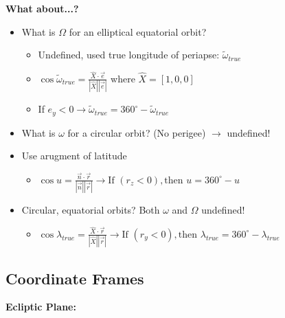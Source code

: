 \documentclass{article}
\begin{document}
\begin{multicols*}{3}
    \textbf{What about...?}
    \begin{itemize}
        \item What is $\Omega$ for an elliptical equatorial orbit?
            \begin{itemize}
                \item Undefined, used true longitude of periapse: $\tilde{\omega}_{true}$
                \item $\cos{\tilde{\omega}_{true}}=\frac{\hat{X}\cdot\vec{e}}{|\hat{X}||\vec{e}|}$ where $\hat{X}=[1,0,0]$
                \item If $e_y<0\rightarrow \tilde{\omega}_{true}=360^\circ-\tilde{\omega}_{true}$
            \end{itemize}
        \item What is $\omega$ for a circular orbit? (No perigee) $\rightarrow$ undefined!
        \item Use arugment of latitude
            \begin{itemize}
                \item $\cos{u}=\frac{\vec{n}\cdot\vec{r}}{|\vec{n}||\vec{r}|}\rightarrow \text{If } (r_z<0), \text{then } u = 360^\circ -u$
            \end{itemize}
        \item Circular, equatorial orbits? Both $\omega$ and $\Omega$ undefined!
            \begin{itemize}
                \item $\cos{\lambda_{true}}=\frac{\hat{X}\cdot{\vec{r}}}{|\hat{X}||\vec{r}|}\rightarrow \text{If } (r_y<0), \text{then } \lambda_{true}=360^\circ - \lambda_{true}$
            \end{itemize}
    \end{itemize}

    \subsection*{Coordinate Frames}
    \textbf{Ecliptic Plane:}\par 
    



\end{multicols*}  
\end{document}
